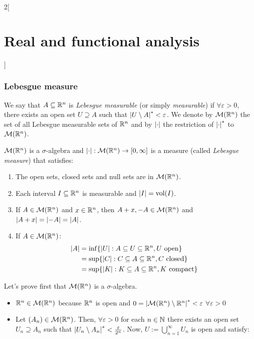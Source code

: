 \documentclass[../../../main_math.tex]{subfiles}
\begin{document}
\begin{multicols}{2}[\section{Real and functional analysis}]
  \subsubsection{Lebesgue measure}
  \begin{definition}
    We say that $A\subseteq\mathbb{R}^n$ is \emph{Lebesgue measurable} (or simply \emph{measurable}) if $\forall \varepsilon>0$, there exists an open set $U\supseteq A$ such that $\om{U\setminus A}<\varepsilon$. We denote by $\mathcal{M}(\mathbb{R}^n)$ the set of all Lebesgue measurable sets of $\mathbb{R}^n$ and by $\m{}$ the restriction of $\om{}$ to ${\mathcal{M}(\mathbb{R}^n)}$.
  \end{definition}
  \begin{theorem}
    $\mathcal{M}(\mathbb{R}^n)$ is a $\sigma$-algebra and $\m{\cdot}:\mathcal{M}(\RR^n)\rightarrow[0,\infty]$ is a measure (called \emph{Lebesgue measure}) that satisfies:
    \begin{enumerate}
      \item The open sets, closed sets and null sets are in $\mathcal{M}(\mathbb{R}^n)$.
      \item Each interval $I\subseteq \mathbb{R}^n$ is measurable and $\m{I}=\vol(I)$.
      \item If $A\in\mathcal{M}(\mathbb{R}^n)$ and $x\in\mathbb{R}^n$, then $A+x,-A\in\mathcal{M}(\mathbb{R}^n)$ and $\m{A+x}=\m{-A}=\m{A}$.
      \item If $A\in\mathcal{M}(\mathbb{R}^n)$:
            \begin{align*}
              \m{A} & =\inf\{\m{U}:A\subseteq U \subseteq\RR^n, U\text{ open}\}   \\
                    & =\sup\{\m{C}:C\subseteq A\subseteq\RR^n, C\text{ closed}\}  \\
                    & =\sup\{\m{K}:K\subseteq A\subseteq\RR^n, K\text{ compact}\}
            \end{align*}
    \end{enumerate}
  \end{theorem}
  \begin{sproof}
    Let's prove first that $\mathcal{M}(\mathbb{R}^n)$ is a $\sigma$-algebra.
    \begin{itemize}
      \item $\mathbb{R}^n\in\mathcal{M}(\mathbb{R}^n)$ because $\mathbb{R}^n$ is open and $0=\om{\mathcal{M}(\RR^n)\setminus\RR^n}<\varepsilon$ $\forall \varepsilon>0$
      \item Let $(A_n)\in\mathcal{M}(\mathbb{R}^n)$. Then, $\forall \varepsilon>0$ for each $n\in\mathbb{N}$ there exists an open set $U_n\supseteq A_n$ such that $\om{U_n\setminus A_n}<\frac{\varepsilon}{2^n}$. Now, $U:=\bigcup_{n=1}^\infty U_n$ is open and satisfy:

\end{itemize}
\end{sproof}
\end{multicols}
\end{document}
